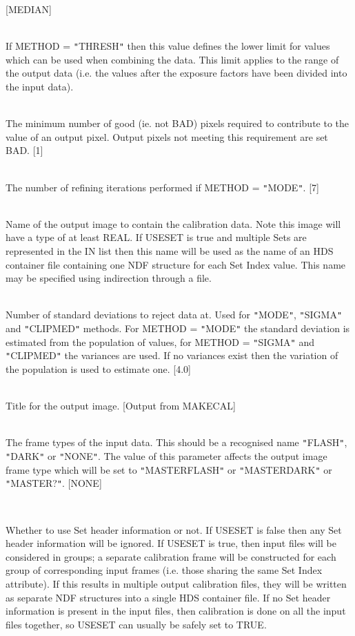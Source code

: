 \documentclass[twoside,11pt]{article}
\renewcommand{\_}{\texttt{\symbol{95}}}
\newcommand{\qt}[1]{{\tt "}#1{\tt "}}
\newcommand{\sstsubsection}[1]{ \item[{#1}] \mbox{} \\}
\newcommand{\sstsubsection}[1]{\item[{#1}]}
\begin{document}
{{{         [MEDIAN]
      }
      \sstsubsection{
         MIN = \_REAL (Read)
      } {
         If METHOD = \qt{THRESH} then this value defines the lower limit
         for values which can be used when combining the data. This
         limit applies to the range of the output data (i.e. the values
         after the exposure factors have been divided into the input
         data).
      }
      \sstsubsection{
         MINPIX = \_INTEGER (Read)
      } {
         The minimum number of good (ie. not BAD) pixels required
         to contribute to the value of an output pixel. Output pixels
         not meeting this requirement are set BAD.
         [1]
      }
      \sstsubsection{
         NITER = \_INTEGER (Read)
      } {
         The number of refining iterations performed if METHOD = \qt{MODE}.
         [7]
      }
      \sstsubsection{
         OUT = LITERAL (Write)
      } {
         Name of the output image to contain the calibration data.
         Note this image will have a type of at least \_REAL.
         If USESET is true and multiple Sets are represented in the IN
         list then this name will be used as the name of an HDS
         container file containing one NDF structure for each Set Index value.
         This name may be specified using indirection through a file.
      }
      \sstsubsection{
         SIGMAS = \_REAL (Read)
      } {
         Number of standard deviations to reject data at. Used for
         \qt{MODE}, \qt{SIGMA} and \qt{CLIPMED} methods. For METHOD =
         \qt{MODE} the standard deviation is estimated from the
         population of values, for METHOD = \qt{SIGMA} and
         \qt{CLIPMED} the variances
         are used. If no variances exist then the variation of the
         population is used to estimate one.
         [4.0]
      }
      \sstsubsection{
         TITLE = LITERAL (Read)
      } {
         Title for the output image.
         [Output from MAKECAL]
      }
      \sstsubsection{
         TYPE = LITERAL (Read)
      } {
         The frame types of the input data. This should be a recognised
         name \qt{FLASH}, \qt{DARK} or \qt{NONE}. The value of this parameter
         affects the output image frame type which will be set to
         \qt{MASTER\_FLASH} or \qt{MASTER\_DARK} or \qt{MASTER\_?}.
         [NONE]
      }
      \sstsubsection{
         USESET = \_LOGICAL (Read)
      } {
         Whether to use Set header information or not.  If USESET is
         false then any Set header information will be ignored.
         If USESET is true, then input files will be considered in
         groups; a separate calibration frame will be constructed 
         for each group of corresponding input frames (i.e. those
         sharing the same Set Index attribute).  If this results in 
         multiple output calibration files, they will be written as 
         separate NDF structures into a single HDS container file.
         If no Set header information is present in the input files, 
         then calibration is done on all the input files together,
         so USESET can usually be safely set to TRUE.

}}}
\end{document}
